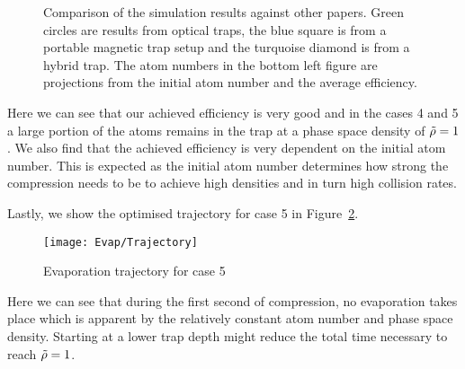 %
\begin{figure}[htbp]
    \centering
    
    \caption[Comparison of the simulation results against other papers]{Comparison of the simulation results against other papers. Green circles are results from optical traps, the blue square is from a portable magnetic trap setup and the turquoise diamond is from a hybrid trap. The atom numbers in the bottom left figure are projections from the initial atom number and the average efficiency.}
    \label{fig:evap_comparison}
\end{figure}
%
Here we can see that our achieved efficiency is very good and in the cases 4 and 5 a large portion of the atoms remains in the trap at a phase space density of $\tilde{\rho} = 1$. We also find that the achieved efficiency is very dependent on the initial atom number. This is expected as the initial atom number determines how strong the compression needs to be to achieve high densities and in turn high collision rates.

Lastly, we show the optimised trajectory for case 5 in Figure~\ref{fig:evap_trajectory}.
%
\begin{figure}[htbp]
    \centering
    \texttt{[image: Evap/Trajectory]}
    \caption{Evaporation trajectory for case 5}
    \label{fig:evap_trajectory}
\end{figure}
Here we can see that during the first second of compression, no evaporation takes place which is apparent by the relatively constant atom number and phase space density. Starting at a lower trap depth might reduce the total time necessary to reach $\tilde{\rho} = 1$.
